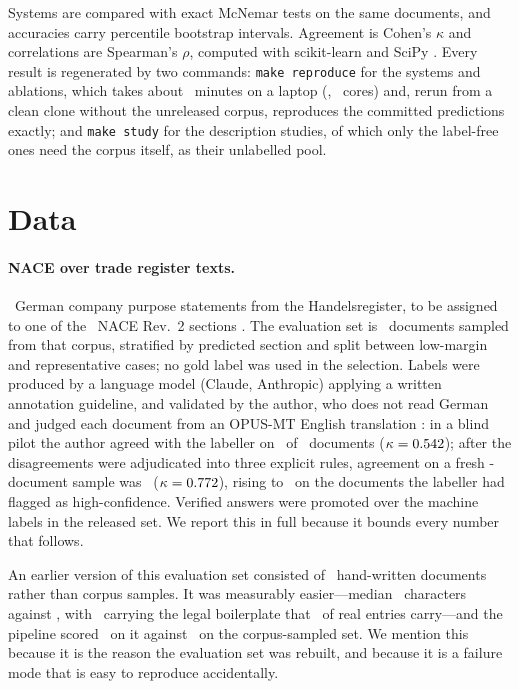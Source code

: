 \documentclass[11pt]{article}
\begin{document}
Systems are compared with exact McNemar tests on the same documents, and
accuracies carry percentile bootstrap intervals. Agreement is Cohen's
$\kappa$ and correlations are Spearman's $\rho$, computed with scikit-learn
\citep{pedregosa-etal-2011-scikit} and SciPy \citep{virtanen-etal-2020-scipy}.
Every result is regenerated by two commands: \texttt{make reproduce} for the
systems and ablations, which takes about \ReproduceMinutes~minutes on a laptop
(\ReproduceCPU, \ReproduceCores\ cores) and, rerun from a clean clone without
the unreleased corpus, reproduces the committed predictions exactly; and
\texttt{make study} for the description studies, of which only the label-free
ones need the corpus itself, as their unlabelled pool.

\section{Data}

\paragraph{NACE over trade register texts.}
\CorpusSize\ German company purpose statements from the Handelsregister, to be
assigned to one of the \NSections\ NACE Rev.~2 sections
\citep{eurostat-nace-2008}. The evaluation set is
\NEVAL\ documents sampled from that corpus, stratified by predicted section and
split between low-margin and representative cases; no gold label was used in the
selection. Labels were produced by a language model (Claude, Anthropic) applying
a written annotation guideline, and validated by the author, who does not read
German and judged each document from an OPUS-MT English translation
\citep{tiedemann-thottingal-2020-opus}: in a blind pilot the author agreed with
the labeller on \PilotAgree\ of \PilotN\ documents ($\kappa = 0.542$); after the
disagreements were adjudicated into three explicit rules, agreement on a fresh
\VerifyN-document sample was \VerifyAgree\ ($\kappa = 0.772$), rising to
\VerifyHighAgree\ on the documents
the labeller had flagged as high-confidence. Verified answers were promoted over
the machine labels in the released set. We report this in full because it
bounds every number that follows.

An earlier version of this evaluation set consisted of \RetiredN\ hand-written
documents rather than corpus samples. It was measurably easier---median
\RetiredMedianChars\ characters against \CorpusMedianChars, with
\RetiredBoilerplate\ carrying the legal boilerplate that \CorpusBoilerplate\ of
real entries carry---and the pipeline scored \RetiredTopOne\ on it against
\OldTaxonomyTopOne\ on the corpus-sampled set. We mention this because it is
the reason the evaluation set was rebuilt, and because it is a failure mode that is easy to reproduce
accidentally.
\end{document}

